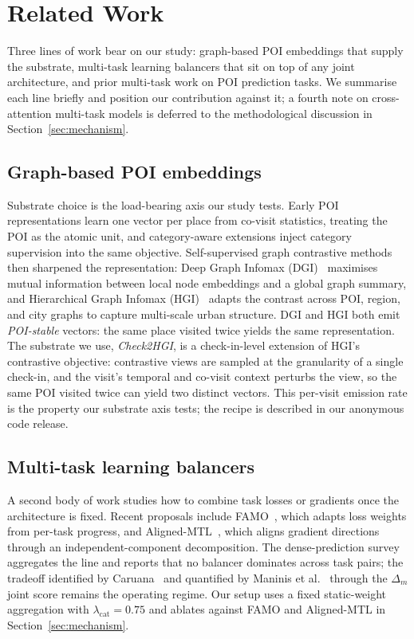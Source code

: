 \section{Related Work}
\label{sec:related}

Three lines of work bear on our study: graph-based POI embeddings that supply the substrate, multi-task learning balancers that sit on top of any joint architecture, and prior multi-task work on POI prediction tasks. We summarise each line briefly and position our contribution against it; a fourth note on cross-attention multi-task models is deferred to the methodological discussion in Section~\ref{sec:mechanism}.

\subsection{Graph-based POI embeddings}
\label{subsec:related-embeddings}

Substrate choice is the load-bearing axis our study tests. Early POI representations learn one vector per place from co-visit statistics, treating the POI as the atomic unit, and category-aware extensions inject category supervision into the same objective. Self-supervised graph contrastive methods then sharpened the representation: Deep Graph Infomax (DGI)~\cite{velickovic2019dgi} maximises mutual information between local node embeddings and a global graph summary, and Hierarchical Graph Infomax (HGI)~\cite{huang2023hgi} adapts the contrast across POI, region, and city graphs to capture multi-scale urban structure. DGI and HGI both emit \emph{POI-stable} vectors: the same place visited twice yields the same representation. The substrate we use, \emph{Check2HGI}, is a check-in-level extension of HGI's contrastive objective: contrastive views are sampled at the granularity of a single check-in, and the visit's temporal and co-visit context perturbs the view, so the same POI visited twice can yield two distinct vectors. This per-visit emission rate is the property our substrate axis tests; the recipe is described in our anonymous code release.

\subsection{Multi-task learning balancers}
\label{subsec:related-mtl}

A second body of work studies how to combine task losses or gradients once the architecture is fixed. Recent proposals include FAMO~\cite{liu2023famo}, which adapts loss weights from per-task progress, and Aligned-MTL~\cite{senushkin2023aligned}, which aligns gradient directions through an independent-component decomposition. The dense-prediction survey~\cite{vandenhende2022mtl} aggregates the line and reports that no balancer dominates across task pairs; the tradeoff identified by Caruana~\cite{caruana1997multitask} and quantified by Maninis et al.~\cite{maninis2019attentive} through the $\Delta_{m}$ joint score remains the operating regime. Our setup uses a fixed static-weight aggregation with $\lambda_{\text{cat}} = 0.75$ and ablates against FAMO and Aligned-MTL in Section~\ref{sec:mechanism}.

